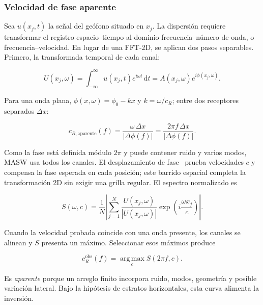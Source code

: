 \subsubsection{Velocidad de fase aparente}

Sea $u(x_j,t)$ la señal del geófono situado en $x_j$. La dispersión requiere transformar
el registro espacio--tiempo al dominio frecuencia--número de onda, o
frecuencia--velocidad. En lugar de una FFT-2D, se aplican dos pasos separables. Primero,
la transformada temporal de cada canal:

\begin{equation}
    U(x_j,\omega)=\int_{-\infty}^{\infty}u(x_j,t)
    e^{i\omega t}\,\mathrm{d}t
    =A(x_j,\omega)e^{i\phi(x_j,\omega)}.
\end{equation}

Para una onda plana, $\phi(x,\omega)=\phi_0-kx$ y $k=\omega/c_R$; entre dos receptores
separados $\Delta x$:

\begin{equation}
    c_{R,\mathrm{aparente}}(f)
    =\frac{\omega\,\Delta x}{|\Delta\phi(f)|}
    =\frac{2\pi f\,\Delta x}{|\Delta\phi(f)|}.
    \label{eq:velocidad-fase-dos-canales}
\end{equation}

Como la fase está definida módulo $2\pi$ y puede contener ruido y varios modos, MASW usa
todos los canales. El desplazamiento de fase~\cite{Park1998} prueba velocidades $c$ y
compensa la fase esperada en cada posición; este barrido espacial completa la
transformación 2D sin exigir una grilla regular. El espectro normalizado es

\begin{equation}
    S(\omega,c)=\frac{1}{N}\left|
    \sum_{j=1}^{N}
    \frac{U(x_j,\omega)}{|U(x_j,\omega)|}
    \exp\!\left(i\frac{\omega x_j}{c}\right)
    \right|.
    \label{eq:phase-shift}
\end{equation}

Cuando la velocidad probada coincide con una onda presente, los canales se alinean y
$S$ presenta un máximo. Seleccionar esos máximos produce

\begin{equation}
    c_R^{\mathrm{obs}}(f)=\operatorname*{arg\,max}_{c}S(2\pi f,c).
\end{equation}

Es \emph{aparente} porque un arreglo finito incorpora ruido, modos, geometría y posible
variación lateral. Bajo la hipótesis de estratos horizontales, esta curva alimenta la
inversión.

